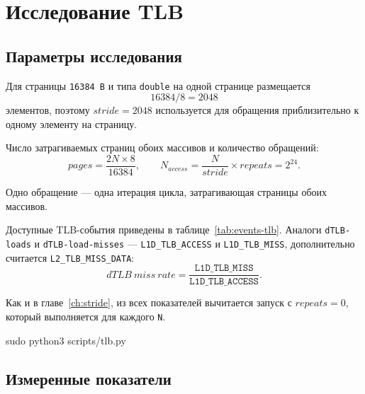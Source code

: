 \chapter{Исследование TLB}
\label{ch:tlb}

\section{Параметры исследования}

Для страницы \texttt{16384 B} и типа \texttt{double} на одной странице размещается
$$
16384 / 8 = 2048
$$
элементов, поэтому $\mathit{stride} = 2048$ используется для обращения приблизительно к одному элементу на страницу.

Число затрагиваемых страниц обоих массивов и количество обращений:
$$
\mathit{pages} = \frac{2N \times 8}{16384}, \qquad
N_{access} = \frac{N}{\mathit{stride}} \times \mathit{repeats} = 2^{24}.
$$

Одно обращение --- одна итерация цикла, затрагивающая страницы обоих массивов.

Доступные TLB-события приведены в таблице~\ref{tab:events-tlb}.
Аналоги \texttt{dTLB-loads} и \texttt{dTLB-load-misses} --- \texttt{L1D\_TLB\_ACCESS} и \texttt{L1D\_TLB\_MISS}, дополнительно считается \texttt{L2\_TLB\_MISS\_DATA}:
$$
\mathit{dTLB\ miss\ rate} = \frac{\texttt{L1D\_TLB\_MISS}}{\texttt{L1D\_TLB\_ACCESS}}.
$$

Как и в главе~\ref{ch:stride}, из всех показателей вычитается запуск с $\mathit{repeats} = 0$, который выполняется для каждого \texttt{N}.

\begin{commands}
sudo python3 scripts/tlb.py
\end{commands}


\section{Измеренные показатели}

